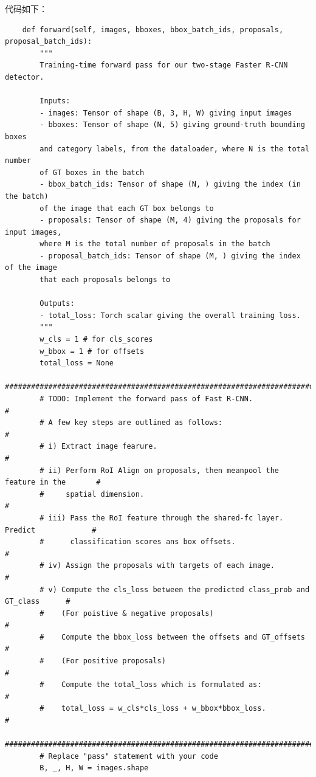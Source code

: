 \documentclass{article}%
\begin{document}
代码如下：
\begin{lstlisting}
    def forward(self, images, bboxes, bbox_batch_ids, proposals, proposal_batch_ids):
        """
        Training-time forward pass for our two-stage Faster R-CNN detector.

        Inputs:
        - images: Tensor of shape (B, 3, H, W) giving input images
        - bboxes: Tensor of shape (N, 5) giving ground-truth bounding boxes
        and category labels, from the dataloader, where N is the total number
        of GT boxes in the batch
        - bbox_batch_ids: Tensor of shape (N, ) giving the index (in the batch)
        of the image that each GT box belongs to
        - proposals: Tensor of shape (M, 4) giving the proposals for input images, 
        where M is the total number of proposals in the batch
        - proposal_batch_ids: Tensor of shape (M, ) giving the index of the image 
        that each proposals belongs to

        Outputs:
        - total_loss: Torch scalar giving the overall training loss.
        """
        w_cls = 1 # for cls_scores
        w_bbox = 1 # for offsets
        total_loss = None
        ##############################################################################
        # TODO: Implement the forward pass of Fast R-CNN.                            #
        # A few key steps are outlined as follows:                                   #
        # i) Extract image fearure.                                                  #
        # ii) Perform RoI Align on proposals, then meanpool the feature in the       #
        #     spatial dimension.                                                     #
        # iii) Pass the RoI feature through the shared-fc layer. Predict             #
        #      classification scores ans box offsets.                                #
        # iv) Assign the proposals with targets of each image.                       # 
        # v) Compute the cls_loss between the predicted class_prob and GT_class      #
        #    (For poistive & negative proposals)                                     #
        #    Compute the bbox_loss between the offsets and GT_offsets                #
        #    (For positive proposals)                                                #
        #    Compute the total_loss which is formulated as:                          #
        #    total_loss = w_cls*cls_loss + w_bbox*bbox_loss.                         #
        ##############################################################################
        # Replace "pass" statement with your code
        B, _, H, W = images.shape
        

\end{lstlisting}
\end{document}
